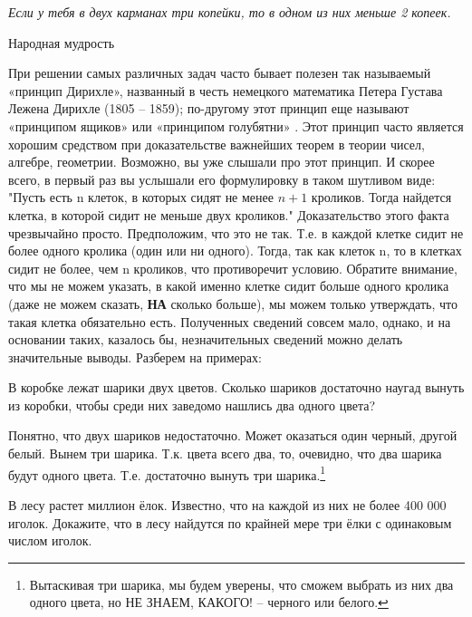 \epigraph{\textit{Если у тебя в двух карманах три копейки, то в одном из них меньше 2 копеек.}}{Народная мудрость}

При решении самых различных задач часто бывает полезен так называемый «принцип Дирихле», названный в честь немецкого математика Петера Густава Лежена Дирихле (1805 – 1859); по-другому этот принцип еще называют «принципом ящиков» или «принципом голубятни» . Этот принцип часто является хорошим средством при доказательстве важнейших теорем  в теории чисел, алгебре, геометрии. Возможно, вы уже слышали про этот принцип. И скорее всего, в первый раз вы услышали его формулировку в таком шутливом виде: "Пусть есть n клеток, в которых сидят не менее $n+1$ кроликов. Тогда найдется клетка, в которой сидит не меньше двух кроликов." Доказательство этого факта чрезвычайно просто. Предположим, что это не так. Т.е. в каждой клетке сидит не более одного кролика (один или ни одного). Тогда, так как клеток n, то в клетках сидит не более, чем n кроликов, что противоречит условию. Обратите внимание, что мы не можем указать, в какой именно клетке сидит больше одного кролика (даже не можем сказать, \textbf{НА} сколько больше), мы можем только утверждать, что такая клетка обязательно есть. Полученных сведений совсем мало, однако, и на основании таких, казалось бы, незначительных сведений можно делать значительные выводы.
Разберем на примерах:
\begin{thm}
	В коробке лежат шарики двух цветов. Сколько шариков достаточно наугад вынуть из коробки, чтобы среди них заведомо нашлись два одного цвета? 
\end{thm}

\begin{prf}
	Понятно, что двух шариков недостаточно. Может оказаться один черный, другой белый. Вынем три шарика. Т.к. цвета всего два, то, очевидно, что два шарика будут одного цвета. Т.е. достаточно вынуть три шарика.\footnote{Вытаскивая три шарика, мы будем уверены, что сможем выбрать из них два одного цвета, но НЕ ЗНАЕМ, КАКОГО! – черного или белого.}
\end{prf}

\begin{thm}
	В лесу растет миллион ёлок. Известно, что на каждой из них не более 400 000 иголок. Докажите, что в лесу найдутся по крайней мере три ёлки с одинаковым числом иголок.
\end{thm}


